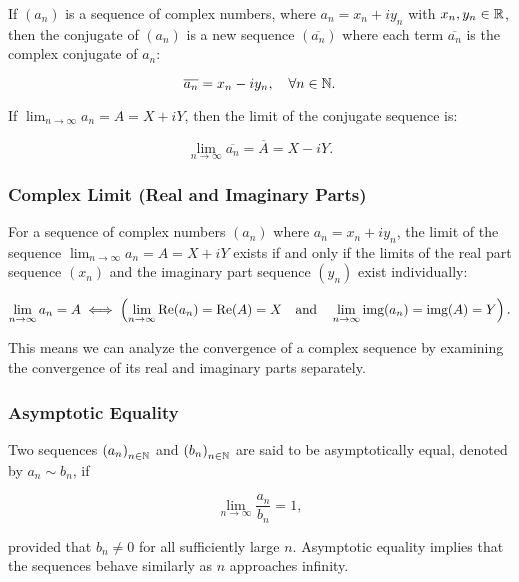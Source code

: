 If \((a_n)\) is a sequence of complex numbers, where \(a_n = x_n + i y_n\) with \(x_n, y_n \in \mathbb{R}\), then the conjugate of \((a_n)\) is a new sequence \((\overline{a_n})\) where each term \(\overline{a_n}\) is the complex conjugate of \(a_n\):

\[
    \overline{a_n} = x_n - i y_n, \quad \forall n \in \mathbb{N}.
\]

If \(\lim_{n \to \infty} a_n = A = X + i Y\), then the limit of the conjugate sequence is:

\[
    \lim_{n \to \infty} \overline{a_n} = \overline{A} = X - i Y.
\]

\subsubsection{Complex Limit (Real and Imaginary Parts)}

For a sequence of complex numbers \((a_n)\) where \(a_n = x_n + i y_n\), the limit of the sequence 
\(\lim_{n \to \infty} a_n = A = X + i Y\) exists if and only if the limits of the real part sequence 
\((x_n)\) and the imaginary part sequence \((y_n)\) exist individually:

\[
    \lim_{n \to \infty} a_n = A \iff \left( \lim_{n \to \infty} \text{Re}(a_n) = \text{Re}(A) = X \quad \text{and} \quad \lim_{n \to \infty} \text{img}(a_n) = \text{img}(A) = Y \right).
\]

This means we can analyze the convergence of a complex sequence by examining the convergence of its real 
and imaginary parts separately.

\subsubsection{Asymptotic Equality}

Two sequences \({(a_n)}_{n \in \mathbb{N}}\) and \({(b_n)}_{n \in \mathbb{N}}\) are said to be 
asymptotically equal, denoted by \(a_n \sim b_n\), if

\[
    \lim_{n \to \infty} \frac{a_n}{b_n} = 1,
\]

provided that \(b_n \neq 0\) for all sufficiently large \(n\). Asymptotic equality implies that the sequences behave similarly as \(n\) approaches infinity.

